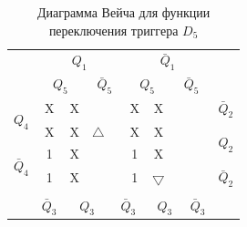 \documentclass[a4paper,14pt]{article}
\begin{document}
\begin{table}[H]
	\begin{center}
		\caption{\label{tab:D5_tab} Диаграмма Вейча для функции переключения триггера $D_5$ }
		\begin{tabular}{cccccccccc}
			& \multicolumn{4}{c}{$Q_1$} & \multicolumn{4}{c}{$\bar{Q}_1$} &  \\
			& \multicolumn{2}{c}{$Q_5$} & \multicolumn{2}{c}{$\bar{Q}_5$} & \multicolumn{2}{c}{$Q_5$} & \multicolumn{2}{c}{$\bar{Q}_5$} &  \\ \cline{2-9}
			\multicolumn{1}{c|}{\multirow{2}{*}{$Q_4$}} & \multicolumn{1}{c|}{X} & \multicolumn{1}{c|}{X} & \multicolumn{1}{c|}{} & \multicolumn{1}{c|}{} & \multicolumn{1}{c|}{X} & \multicolumn{1}{c|}{X} & \multicolumn{1}{c|}{} & \multicolumn{1}{c|}{} & $\bar{Q}_2$ \\ \cline{2-9}
			\multicolumn{1}{c|}{} & \multicolumn{1}{c|}{X} & \multicolumn{1}{c|}{X} & \multicolumn{1}{c|}{$\bigtriangleup$} & \multicolumn{1}{c|}{} & \multicolumn{1}{c|}{X} & \multicolumn{1}{c|}{X} & \multicolumn{1}{c|}{} & \multicolumn{1}{c|}{} & \multirow{2}{*}{$Q_2$} \\ \cline{2-9}
			\multicolumn{1}{c|}{\multirow{2}{*}{$\bar{Q}_4$}} & \multicolumn{1}{c|}{1} & \multicolumn{1}{c|}{X} & \multicolumn{1}{c|}{} & \multicolumn{1}{c|}{} & \multicolumn{1}{c|}{1} & \multicolumn{1}{c|}{X} & \multicolumn{1}{c|}{} & \multicolumn{1}{c|}{} &  \\ \cline{2-9}
			\multicolumn{1}{c|}{} & \multicolumn{1}{c|}{1} & \multicolumn{1}{c|}{X} & \multicolumn{1}{c|}{} & \multicolumn{1}{c|}{} & \multicolumn{1}{c|}{1} & \multicolumn{1}{c|}{$\bigtriangledown$} & \multicolumn{1}{c|}{} & \multicolumn{1}{c|}{} & $\bar{Q}_2$ \\ \cline{2-9}
			&  & \multicolumn{2}{c}{} & \multicolumn{2}{c}{} & \multicolumn{2}{c}{} &  &  \\
			& $\bar{Q}_3$ & \multicolumn{2}{c}{$Q_3$} & \multicolumn{2}{c}{$\bar{Q}_3$} & \multicolumn{2}{c}{$Q_3$} & $\bar{Q}_3$ & 
		\end{tabular}
	\end{center}
\end{table}

\end{document}
